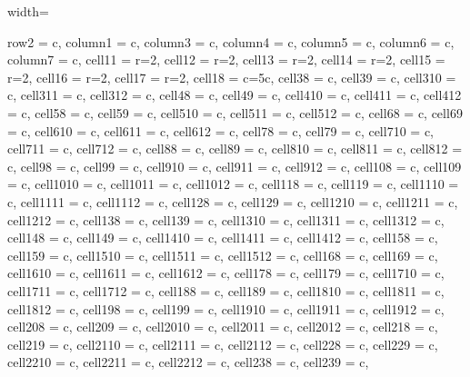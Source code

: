\documentclass[lettersize,journal]{IEEEtran}
\begin{document}
\begin{table}
\caption{Test of trained models over the real dataset of 6,145 events.}
\centering
\begin{adjustbox}{width=\textwidth}
\begin{tblr}{
  row{2} = {c}, column{1} = {c}, column{3} = {c},  column{4} = {c},  column{5} = {c},
  column{6} = {c},  column{7} = {c},  cell{1}{1} = {r=2}{},  cell{1}{2} = {r=2}{},
  cell{1}{3} = {r=2}{},  cell{1}{4} = {r=2}{},  cell{1}{5} = {r=2}{},  cell{1}{6} = {r=2}{},
  cell{1}{7} = {r=2}{},  cell{1}{8} = {c=5}{c},  cell{3}{8} = {c},  cell{3}{9} = {c},
  cell{3}{10} = {c},  cell{3}{11} = {c},  cell{3}{12} = {c},  cell{4}{8} = {c},
  cell{4}{9} = {c},  cell{4}{10} = {c},  cell{4}{11} = {c},  cell{4}{12} = {c},
  cell{5}{8} = {c},  cell{5}{9} = {c},  cell{5}{10} = {c},  cell{5}{11} = {c},
  cell{5}{12} = {c},  cell{6}{8} = {c},  cell{6}{9} = {c},  cell{6}{10} = {c},
  cell{6}{11} = {c},  cell{6}{12} = {c},  cell{7}{8} = {c},  cell{7}{9} = {c},
  cell{7}{10} = {c},  cell{7}{11} = {c},  cell{7}{12} = {c},  cell{8}{8} = {c},
  cell{8}{9} = {c},  cell{8}{10} = {c},  cell{8}{11} = {c},  cell{8}{12} = {c},
  cell{9}{8} = {c},  cell{9}{9} = {c},  cell{9}{10} = {c},  cell{9}{11} = {c},
  cell{9}{12} = {c},  cell{10}{8} = {c},  cell{10}{9} = {c},  cell{10}{10} = {c},
  cell{10}{11} = {c},  cell{10}{12} = {c},  cell{11}{8} = {c},  cell{11}{9} = {c},
  cell{11}{10} = {c},  cell{11}{11} = {c},  cell{11}{12} = {c},  cell{12}{8} = {c},
  cell{12}{9} = {c},  cell{12}{10} = {c},  cell{12}{11} = {c},  cell{12}{12} = {c},
  cell{13}{8} = {c},  cell{13}{9} = {c},  cell{13}{10} = {c},  cell{13}{11} = {c},
  cell{13}{12} = {c},  cell{14}{8} = {c},  cell{14}{9} = {c},  cell{14}{10} = {c},
  cell{14}{11} = {c},  cell{14}{12} = {c},  cell{15}{8} = {c},  cell{15}{9} = {c},
  cell{15}{10} = {c},  cell{15}{11} = {c},  cell{15}{12} = {c},  cell{16}{8} = {c},
  cell{16}{9} = {c},  cell{16}{10} = {c},  cell{16}{11} = {c},  cell{16}{12} = {c},
  cell{17}{8} = {c},  cell{17}{9} = {c},  cell{17}{10} = {c},  cell{17}{11} = {c},
  cell{17}{12} = {c},  cell{18}{8} = {c},  cell{18}{9} = {c},  cell{18}{10} = {c},
  cell{18}{11} = {c},  cell{18}{12} = {c},  cell{19}{8} = {c},  cell{19}{9} = {c},
  cell{19}{10} = {c},  cell{19}{11} = {c},  cell{19}{12} = {c},  cell{20}{8} = {c},
  cell{20}{9} = {c},  cell{20}{10} = {c},  cell{20}{11} = {c},  cell{20}{12} = {c},
  cell{21}{8} = {c},  cell{21}{9} = {c},  cell{21}{10} = {c},  cell{21}{11} = {c},
  cell{21}{12} = {c},  cell{22}{8} = {c},  cell{22}{9} = {c},  cell{22}{10} = {c},
  cell{22}{11} = {c},  cell{22}{12} = {c},  cell{23}{8} = {c},  cell{23}{9} = {c},
}
\end{tblr}
\end{adjustbox}
\end{table}
\end{document}
